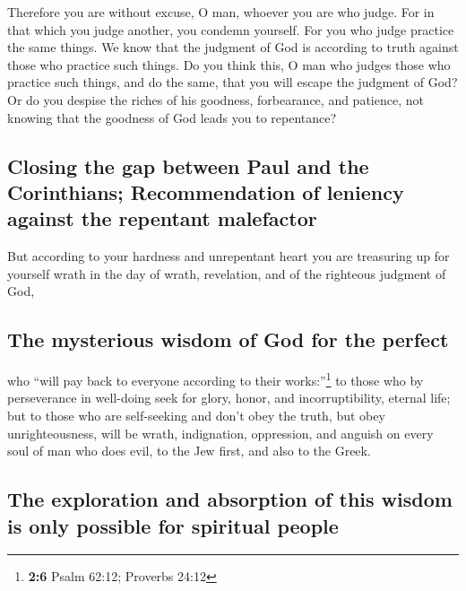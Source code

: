  Therefore you are without excuse, O man, whoever you are
who judge. For in that which you judge another, you condemn yourself.
For you who judge practice the same things.  We know that
the judgment of God is according to truth against those who practice
such things.  Do you think this, O man who judges those
who practice such things, and do the same, that you will escape the
judgment of God?  Or do you despise the riches of his
goodness, forbearance, and patience, not knowing that the goodness of
God leads you to repentance?

\hypertarget{closing-the-gap-between-paul-and-the-corinthians-recommendation-of-leniency-against-the-repentant-malefactor}{%
\subsection{Closing the gap between Paul and the Corinthians;
Recommendation of leniency against the repentant
malefactor}\label{closing-the-gap-between-paul-and-the-corinthians-recommendation-of-leniency-against-the-repentant-malefactor}}

 But according to your hardness and unrepentant heart you
are treasuring up for yourself wrath in the day of wrath, revelation,
and of the righteous judgment of God,

\hypertarget{the-mysterious-wisdom-of-god-for-the-perfect}{%
\subsection{The mysterious wisdom of God for the
perfect}\label{the-mysterious-wisdom-of-god-for-the-perfect}}

 who ``will pay back to everyone according to their
works:''\footnote{\textbf{2:6} Psalm 62:12; Proverbs 24:12}
 to those who by perseverance in well-doing seek for
glory, honor, and incorruptibility, eternal life;  but to
those who are self-seeking and don't obey the truth, but obey
unrighteousness, will be wrath, indignation,  oppression,
and anguish on every soul of man who does evil, to the Jew first, and
also to the Greek.

\hypertarget{the-exploration-and-absorption-of-this-wisdom-is-only-possible-for-spiritual-people}{%
\subsection{The exploration and absorption of this wisdom is only
possible for spiritual
people}\label{the-exploration-and-absorption-of-this-wisdom-is-only-possible-for-spiritual-people}}

